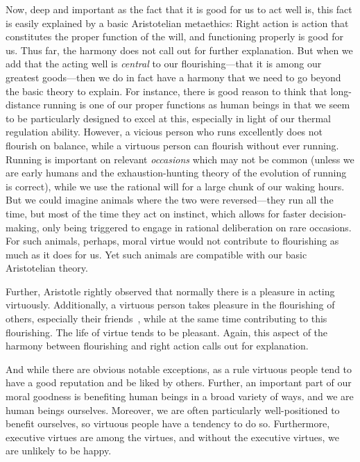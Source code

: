 Now, deep and important as the fact that it is good for us to act well is, this fact is easily explained by
a basic Aristotelian metaethics: Right action is action that constitutes the proper function of the will, and functioning
properly is good for us. Thus far, the harmony does not call out for further explanation. But when we add that
the acting well is \textit{central} to our flourishing---that it is among our greatest goods---then we do in
fact have a harmony that we need to go beyond the basic theory to explain. For instance, there is good reason
to think that long-distance running is one of our proper functions as human beings in that we seem to be particularly
designed to excel at this, especially in light of our thermal regulation ability. However, a vicious person who runs excellently does not flourish on balance,
while a virtuous person can flourish without ever running. Running is important on relevant \textit{occasions}
which may not be common (unless we are early humans and the exhaustion-hunting theory of the evolution of
running is correct), while
we use the rational will for a large chunk of our waking hours. But we could imagine animals where the two
were reversed---they run all the time, but most of the time they act on instinct, which allows for faster
decision-making, only being triggered to engage in rational deliberation on rare occasions. For such animals,
perhaps, moral virtue would not contribute to flourishing as much as it does for us. Yet such animals are
compatible with our basic Aristotelian theory.

Further, Aristotle rightly observed that normally there is a pleasure in acting virtuously. Additionally, a virtuous 
person takes pleasure in the flourishing of others, especially their friends~\parencite[IV.9]{AristotleNE}, while at the same time 
contributing to this flourishing. The life of virtue tends to be pleasant. Again, this aspect of the harmony
between flourishing and right action calls out for explanation.

And while there are obvious notable exceptions, as a rule virtuous people tend to have a good reputation and be liked
by others. Further, an important part of our moral goodness is benefiting human beings in a broad variety of ways, and we 
are human beings ourselves. Moreover, we are often particularly well-positioned to benefit ourselves, so virtuous people
have a tendency to do so. Furthermore, executive virtues are among the virtues, and without the executive virtues, we are 
unlikely to be happy.


